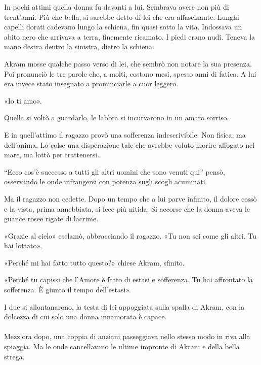 \documentclass[a4paper,12pt]{book}
\begin{document}
In pochi attimi quella donna fu davanti a lui. Sembrava avere non più di
trent'anni. Più che bella, si sarebbe detto di lei che era affascinante. Lunghi
capelli dorati cadevano lungo la schiena, fin quasi sotto la vita. Indossava un
abito nero che arrivava a terra, finemente ricamato. I piedi erano nudi. Teneva
la mano destra dentro la sinistra, dietro la schiena.

Akram mosse qualche passo verso di lei, che sembrò non notare la sua presenza.
Poi pronunciò le tre parole che, a molti, costano mesi, spesso anni di fatica.
A lui era invece stato insegnato a pronunciarle a cuor leggero.

«Io ti amo».

Quella si voltò a guardarlo, le labbra si incurvarono in un amaro sorriso.

E in quell'attimo il ragazzo provò una sofferenza indescrivibile. Non fisica,
ma dell'anima. Lo colse una disperazione tale che avrebbe voluto morire affogato
nel mare, ma lottò per trattenersi.

``Ecco cos'è successo a tutti gli altri uomini che sono venuti qui'' pensò,
osservando le onde infrangersi con potenza sugli scogli acuminati.

Ma il ragazzo non cedette. Dopo un tempo che a lui parve infinito, il dolore
cessò e la vista, prima annebbiata, si fece più nitida. Si accorse che la
donna aveva le guance rosee rigate di lacrime.

«Grazie al cielo» esclamò, abbracciando il ragazzo. «Tu non sei come gli
altri. Tu hai lottato».

«Perché mi hai fatto tutto questo?» chiese Akram, sfinito.

«Perché tu capissi che l'Amore è fatto di estasi e sofferenza. Tu hai
affrontato la sofferenza. È giunto il tempo dell'estasi».

I due si allontanarono, la testa di lei appoggiata sulla spalla di Akram, con la
dolcezza di cui solo una donna innamorata è capace.

\paragraph{}
Mezz'ora dopo, una coppia di anziani passeggiava nello stesso modo in riva alla
spiaggia. Ma le onde cancellavano le ultime impronte di Akram e della bella
strega.
\end{document}
